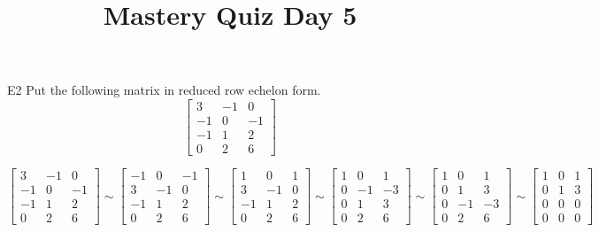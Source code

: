 \documentclass{sbgLAquiz}
\title{Mastery Quiz Day 5 }
\begin{document}
\begin{problem}{E2}
Put the following matrix in reduced row echelon form.
$$\begin{bmatrix}
 3 & -1 & 0 \\
 -1 & 0 & -1 \\
 -1 & 1 & 2 \\
 0 & 2 & 6
\end{bmatrix}$$
\end{problem}
\begin{solution}
$$\begin{bmatrix}
 3 & -1 & 0 \\
 -1 & 0 & -1 \\
 -1 & 1 & 2 \\
 0 & 2 & 6
\end{bmatrix}
\sim 
\begin{bmatrix}
 -1 & 0 & -1 \\
 3 & -1 & 0 \\
 -1 & 1 & 2 \\
 0 & 2 & 6
\end{bmatrix}
\sim 
\begin{bmatrix}
 1 & 0 & 1 \\
 3 & -1 & 0 \\
 -1 & 1 & 2 \\
 0 & 2 & 6
\end{bmatrix}
\sim
\begin{bmatrix}
 1 & 0 & 1 \\
 0 & -1 & -3 \\
 0 & 1 & 3 \\
 0 & 2 & 6
\end{bmatrix}
\sim
\begin{bmatrix}
 1 & 0 & 1 \\
 0 & 1 & 3 \\
 0 & -1 & -3 \\
 0 & 2 & 6
\end{bmatrix}
\sim
\begin{bmatrix}
 1 & 0 & 1 \\
 0 & 1 & 3 \\
 0 & 0 & 0 \\ 
0 & 0 & 0 
\end{bmatrix}$$
\end{solution}
\end{document}
